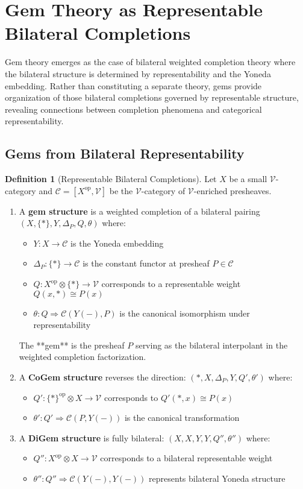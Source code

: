 \documentclass[11pt]{article}
\theoremstyle{plain}
\theoremstyle{definition}
\newtheorem{definition}[theorem]{Definition}
\theoremstyle{remark}
\newcommand{\V}{\mathcal{V}}
\newcommand{\C}{\mathcal{C}}
\newcommand{\op}{\mathrm{op}}
\begin{document}
\section{Gem Theory as Representable Bilateral Completions}

Gem theory emerges as the case of bilateral weighted completion theory where the bilateral structure is determined by representability and the Yoneda embedding. Rather than constituting a separate theory, gems provide organization of those bilateral completions governed by representable structure, revealing connections between completion phenomena and categorical representability.

\subsection{Gems from Bilateral Representability}

\begin{definition}[Representable Bilateral Completions]\label{def:gems}
Let $X$ be a small $\V$-category and $\C = [X^{\op}, \V]$ be the $\V$-category of $\V$-enriched presheaves.

\begin{enumerate}
\item A \textbf{gem structure} is a weighted completion of a bilateral pairing $(X, \{\ast\}, Y, \Delta_P, Q, \theta)$ where:
\begin{itemize}
\item $Y : X \to \C$ is the Yoneda embedding
\item $\Delta_P : \{\ast\} \to \C$ is the constant functor at presheaf $P \in \C$
\item $Q : X^{\op} \otimes \{\ast\} \to \V$ corresponds to a representable weight $Q(x, \ast) \cong P(x)$
\item $\theta : Q \Rightarrow \C(Y(-), P)$ is the canonical isomorphism under representability
\end{itemize}

The **gem** is the presheaf $P$ serving as the bilateral interpolant in the weighted completion factorization.

\item A \textbf{CoGem structure} reverses the direction: $({\ast}, X, \Delta_P, Y, Q', \theta')$ where:
\begin{itemize}
\item $Q' : \{\ast\}^{\op} \otimes X \to \V$ corresponds to $Q'(\ast, x) \cong P(x)$
\item $\theta' : Q' \Rightarrow \C(P, Y(-))$ is the canonical transformation
\end{itemize}

\item A \textbf{DiGem structure} is fully bilateral: $(X, X, Y, Y, Q'', \theta'')$ where:
\begin{itemize}
\item $Q'' : X^{\op} \otimes X \to \V$ corresponds to a bilateral representable weight
\item $\theta'' : Q'' \Rightarrow \C(Y(-), Y(-))$ represents bilateral Yoneda structure
\end{itemize}
\end{enumerate}
\end{definition}
\end{document}
